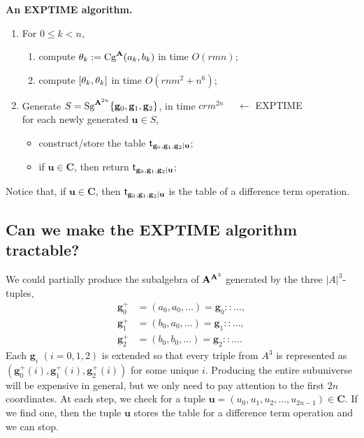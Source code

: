     \noindent \textbf{An {\small EXPTIME} algorithm.}
     \begin{enumerate}
       \item For $0\leq k < n$,
       \begin{enumerate}
         \item compute $\theta_k:= \operatorname{Cg}^{\mathbf{A}}(a_k, b_k)$ in time $O(rmn)$;
         \item compute $[ \theta_k ,  \theta_k ]$ in time $O(rnm^2 + n^6)$;
       \end{enumerate}
    \item Generate $S=\operatorname{Sg}^{\mathbf{A}^{2n}} \{\mathbf{g}_0, \mathbf{g}_1, \mathbf{g}_2\}$,
      in time $c r m^{2n}$ {\tiny {\color{red} $\quad \leftarrow$ EXPTIME}}\\
    for each newly generated $\mathbf{u} \in S$,
      \begin{itemize}
      \item construct/store the table
        $\mathsf{t}_{\mathbf{g}_0, \mathbf{g}_1, \mathbf{g}_2|\mathbf{u}}$;
      \item if $\mathbf{u} \in \mathbf{C}$, then return     $\mathsf{t}_{\mathbf{g}_0, \mathbf{g}_1, \mathbf{g}_2|\mathbf{u}}$;
      \end{itemize}
    \end{enumerate}
    Notice that, if $\mathbf{u} \in \mathbf{C}$, then $\mathsf{t}_{\mathbf{g}_0, \mathbf{g}_1, \mathbf{g}_2|\mathbf{u}}$  is the table of a difference term operation.

    \subsection{Can we make the {\small EXPTIME} algorithm tractable?}
    We could partially produce the subalgebra of $\mathbf{A}^{\mathbf{A}^3}$ generated by
    the three $|A|^3$-tuples,
    \begin{align*}
    \mathbf{g}^+_0 &= (a_0, a_0, \dots) = \mathbf{g}_0 :: \dots,\\
    \mathbf{g}^+_1 &= (b_0, a_0, \dots) = \mathbf{g}_1 :: \dots,\\
    \mathbf{g}^+_2 &= (b_0, b_0, \dots) = \mathbf{g}_2 :: \dots.
    \end{align*}
    Each $\mathbf{g}_i$ $(i=0,1,2)$ is extended so that every
    triple from $A^3$ is represented as $(\mathbf{g}^+_0(i), \mathbf{g}^+_1(i), \mathbf{g}^+_2(i))$ for some
    unique $i$.  Producing the entire subuniverse will be expensive in
    general, but we only need to pay attention to the first $2n$ coordinates.
    At each step, we check for a tuple $\mathbf{u} = (u_0, u_1, u_2, \dots, u_{2n-1})\in \mathbf{C}$.
    If we find one, then the tuple $\mathbf{u}$ stores
    the table for a difference term operation and we can stop.

